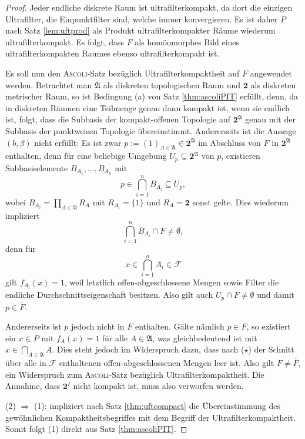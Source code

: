 \begin{proof}
  Jeder endliche diskrete Raum ist ultrafilterkompakt, da dort die einzigen Ultrafilter, die Einpunktfilter sind, welche immer konvergieren.
  Es ist daher $P$ nach Satz \ref{lem:uftprod} als Produkt ultrafilterkompakter Räume wiederum ultrafilterkompakt.
  Es folgt, dass $F$ als homöomorphes Bild eines ultrafilterkompakten Raumes ebenso ultrafilterkompakt ist.

  Es soll nun den \textsc{Ascoli}\hyp{}Satz bezüglich Ultrafilterkompaktheit auf $F$ angewendet werden.
  Betrachtet man $\mathfrak{A}$ als diskreten topologischen Raum und $\mathbf{2}$ als diskreten metrischer Raum, so ist Bedingung (a) von Satz \ref{thm:ascoliPIT} erfüllt, denn, da in diskreten Räumen eine Teilmenge genau dann kompakt ist, wenn sie endlich ist, folgt, dass die Subbasis der kompakt\hyp{}offenen Topologie auf $\mathbf{2}^\mathfrak{A}$ genau mit der Subbasis der punktweisen Topologie übereinstimmt. 
  Andererseits ist die Aussage $(b, \beta)$ nicht erfüllt:
  Es ist zwar $p := (1)_{A \in \mathfrak{A}} \in \mathbf{2}^\mathfrak{A}$ im Abschluss von $F$ in $\mathbf{2}^\mathfrak{A}$ enthalten, denn für eine beliebige Umgebung $U_p \subseteq \mathbf{2}^\mathfrak{A}$ von $p$, existieren Subbasiselemente $B_{A_1},\dots,B_{A_n}$ mit 
  \begin{displaymath}
    p \in \bigcap_{i=1}^n B_{A_i} \subseteq U_p,
  \end{displaymath}
  wobei $B_{A_i} = \prod_{A \in \mathfrak{A}} R_{A}$ mit  $R_{A_i} = \{1\}$ und $R_A = \mathbf{2}$ sonst gelte.
  Dies wiederum impliziert
  \begin{displaymath}
    \bigcap_{i=1}^n B_{A_i} \cap F \neq \emptyset,
  \end{displaymath}
  denn für 
  \begin{displaymath}
    x \in \bigcap_{i=1}^n A_i \in \mathcal{F}
  \end{displaymath}
  gilt $f_{A_i}(x) = 1$, weil letztlich offen\hyp{}abgeschlossene Mengen sowie Filter die endliche Durchschnittseigenschaft besitzen.
  Also gilt auch $U_p \cap F \neq \emptyset$ und damit $p \in \overline F$.
  
  Andererseits ist $p$ jedoch nicht in $F$ enthalten. 
  Gälte nämlich $p \in F$, so existiert ein $x \in P$ mit $f_A(x) = 1$ für alle $A \in \mathfrak{A}$, was gleichbedeutend ist mit $x \in \bigcap_{A \in \mathfrak{A}} A$.
  Dies steht jedoch im Widerspruch dazu, dass nach ($\star$) der Schnitt über alle in $\mathcal{F}$ enthaltenen offen\hyp{}abgeschlossenen Mengen leer ist.
  Also gilt $F \neq \overline{F}$, ein Widerspruch zum \textsc{Ascoli}\hyp{}Satz bezüglich Ultrafilterkompaktheit.
  Die Annahme, dass $\mathbf{2}^I$ nicht kompakt ist, muss also verworfen werden.

  (2) $\Rightarrow$ (1): \PIT impliziert nach Satz \ref{thm:uftcompact} die Übereinstimmung des gewöhnlichen Kompaktheitsbegriffes mit dem Begriff der Ultrafilterkompaktheit. Somit folgt (1) direkt aus Satz \ref{thm:ascoliPIT}.
\end{proof}

